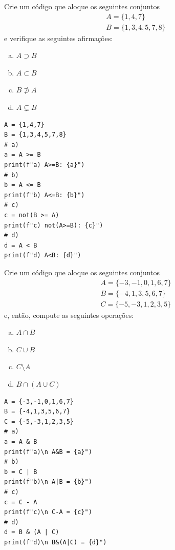 \begin{exer}
  Crie um código que aloque os seguintes conjuntos
  \begin{align}
    & A = \{1,4,7\} \\
    & B = \{1,3,4,5,7,8\}
  \end{align}
  e verifique as seguintes afirmações:
  \begin{enumerate}[a)]
  \item $A\supset B$
  \item $A\subset B$
  \item $B\not\supset A$
  \item $A\subsetneq B$
  \end{enumerate}
\end{exer}
\begin{resp}

\begin{lstlisting}
A = {1,4,7}
B = {1,3,4,5,7,8}
# a)
a = A >= B
print(f"a) A>=B: {a}")
# b)
b = A <= B
print(f"b) A<=B: {b}")
# c)
c = not(B >= A)
print(f"c) not(A>=B): {c}")
# d)
d = A < B
print(f"d) A<B: {d}")
\end{lstlisting}

\end{resp}

\begin{exer}
  Crie um código que aloque os seguintes conjuntos
  \begin{align}
    & A = \{-3,-1,0,1,6,7\} \\
    & B = \{-4,1,3,5,6,7\} \\
    & C = \{-5,-3,1,2,3,5\}
  \end{align}
  e, então, compute as seguintes operações:
  \begin{enumerate}[a)]
  \item $A\cap B$\\
  \item $C\cup B$\\
  \item $C\setminus A$\\
  \item $B\cap (A\cup C)$
  \end{enumerate}
\end{exer}
\begin{resp}

\begin{lstlisting}
A = {-3,-1,0,1,6,7}
B = {-4,1,3,5,6,7}
C = {-5,-3,1,2,3,5}
# a)
a = A & B
print(f"a)\n A&B = {a}")
# b)
b = C | B
print(f"b)\n A|B = {b}")
# c)
c = C - A
print(f"c)\n C-A = {c}")
# d)
d = B & (A | C)
print(f"d)\n B&(A|C) = {d}")
\end{lstlisting}

\end{resp}

